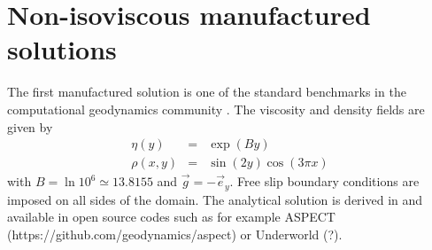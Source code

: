 \documentclass[a4paper]{article}
\begin{document}
\section{Non-isoviscous manufactured solutions}

The first manufactured solution is one of the standard benchmarks in the computational geodynamics 
community  \cite{mozg96,mamo08,krhb12,gemd13,demh19,thba22}.
The viscosity and density fields are given by 
\begin{eqnarray}
\eta(y)&=&\exp(By) \\
\rho(x,y)&=&\sin(2y) \cos(3\pi x)
\end{eqnarray}
with $B=\ln 10^6 \simeq 13.8155$ and $\vec{g}=-\vec{e}_y$. 
Free slip boundary conditions are imposed on all sides of the domain.
The analytical solution is derived in \cite{XXX} and available in open source codes
such as for example ASPECT (https://github.com/geodynamics/aspect) or Underworld (?).
\end{document}
